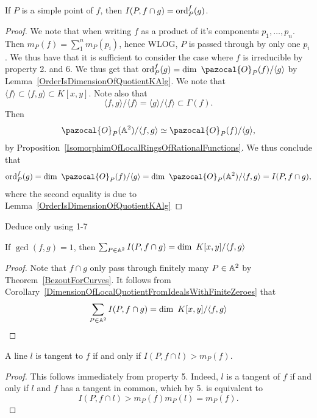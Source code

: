     \begin{proposition}\label{WhenPointIsSimpleOnOneCurveIntersectionEqualsOrderWRTSaidCurveAtPoint}
        If $P$ is a simple point of $f$, then $I(P,f\cap g)=\mathrm{ord}_P^f(g)$.
    \end{proposition}
    \begin{proof}
        We note that when writing $f$ as a product of it's components $p_1,\dots, p_n$. Then $m_P(f)=\sum_1^n m_P(p_i)$, hence WLOG, $P$ is passed through by only one $p_i$. We thus have that it is sufficient to consider the case where $f$ is irreducible by property 2. and 6. We thus get that $\ord_P^f(g)=\dim \ \pazocal{O}_P(f)/\langle g\rangle$ by Lemma~\ref{OrderIsDimensionOfQuotientKAlg}. We note that $\langle f\rangle \subset \langle f,g\rangle\subset K[x,y]$. Note also that $$\langle f,g\rangle/\langle f\rangle =\langle g\rangle /\langle f\rangle \subset \Gamma(f).$$ 
        Then 
        $$\pazocal{O}_P(\A^2)/\langle f,g\rangle \simeq \pazocal{O}_P(f)/\langle g\rangle,$$
        by Proposition~\ref{IsomorphimOfLocalRingsOfRationalFunctions}. We thus conclude that $$\ord_P^f(g)= \dim \ \pazocal{O}_P(f)/\langle g\rangle= \dim\ \pazocal{O}_P(\A^2)/\langle f,g\rangle=I(P,f\cap g),$$
        where the second equality is due to Lemma~\ref{OrderIsDimensionOfQuotientKAlg}
    \end{proof}
    \begin{remark}
        {\Large Deduce only using 1-7}
    \end{remark}
    \begin{proposition}\label{SumOfIntersectionNumbersIsFinite}
        If $\gcd(f,g)=1$, then $\sum_{P\in \A^2} I(P,f\cap g)=\dim \ K[x,y]/\langle f,g\rangle$
    \end{proposition}
    \begin{proof}
        Note that $f\cap g$ only pass through finitely many $P\in \mathbb{A}^2$ by Theorem~\ref{BezoutForCurves}. It follows from Corollary~\ref{DimensionOfLocalQuotientFromIdealsWithFiniteZeroes} that
        $$\sum_{P\in \A^2} I(P,f\cap g)= \dim\ K[x,y]/\langle f,g\rangle$$
    \end{proof}
    \begin{corollary}\label{IntersectionNumberOfCurveWithItsTangent}
        A line $l$ is tangent to $f$ if and only if $I(P,f\cap l)>m_P(f).$
    \end{corollary}
    \begin{proof}
        This follows immediately from property 5. Indeed, $l$ is a tangent of $f$ if and only if $l$ and $f$ has a tangent in common, which by 5. is equivalent to 
        $$I(P,f\cap l)>m_P(f)m_P(l)=m_P(f).$$
    \end{proof}
